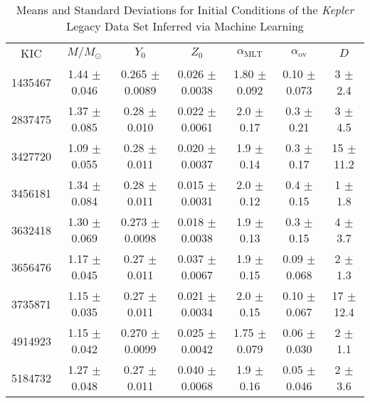 \documentclass[epjCONF,columns]{svjour} %
\begin{document}
\begin{table*}
    \centering
    \caption{Means and Standard Deviations for Initial Conditions of the \emph{Kepler} Legacy Data Set Inferred via Machine Learning}
    \label{tab:2}
    \fontsize{8}{9.5}\selectfont%
    \begin{tabular}{c|cccccc}
        \hline\noalign{\smallskip}
        KIC & $M/M_\odot$ & $Y_0$ & $Z_0$ & $\alpha_{\mathrm{MLT}}$ & $\alpha_{\mathrm{ov}}$ & $D$ \\
        \noalign{\smallskip}\hline\noalign{\smallskip}
1435467  &        1.44   $\pm$  0.046    &        0.265  $\pm$  0.0089   &        0.026  $\pm$  0.0038   &        1.80   $\pm$  0.092    &        0.10   $\pm$  0.073    &        3      $\pm$  2.4      \\
2837475  &        1.37   $\pm$  0.085    &        0.28   $\pm$  0.010    &        0.022  $\pm$  0.0061   &        2.0    $\pm$  0.17     &        0.3    $\pm$  0.21     &        3      $\pm$  4.5      \\
3427720  &        1.09   $\pm$  0.055    &        0.28   $\pm$  0.011    &        0.020  $\pm$  0.0037   &        1.9    $\pm$  0.14     &        0.3    $\pm$  0.17     &       15      $\pm$ 11.2      \\
3456181  &        1.34   $\pm$  0.084    &        0.28   $\pm$  0.011    &        0.015  $\pm$  0.0031   &        2.0    $\pm$  0.12     &        0.4    $\pm$  0.15     &        1      $\pm$  1.8      \\
3632418  &        1.30   $\pm$  0.069    &        0.273  $\pm$  0.0098   &        0.018  $\pm$  0.0038   &        1.9    $\pm$  0.13     &        0.3    $\pm$  0.15     &        4      $\pm$  3.7      \\
3656476  &        1.17   $\pm$  0.045    &        0.27   $\pm$  0.011    &        0.037  $\pm$  0.0067   &        1.9    $\pm$  0.15     &        0.09   $\pm$  0.068    &        2      $\pm$  1.3      \\
3735871  &        1.15   $\pm$  0.035    &        0.27   $\pm$  0.011    &        0.021  $\pm$  0.0034   &        2.0    $\pm$  0.15     &        0.10   $\pm$  0.067    &       17      $\pm$ 12.4      \\
4914923  &        1.15   $\pm$  0.042    &        0.270  $\pm$  0.0099   &        0.025  $\pm$  0.0042   &        1.75   $\pm$  0.079    &        0.06   $\pm$  0.030    &        2      $\pm$  1.1      \\
5184732  &        1.27   $\pm$  0.048    &        0.27   $\pm$  0.011    &        0.040  $\pm$  0.0068   &        1.9    $\pm$  0.16     &        0.05   $\pm$  0.046    &        2      $\pm$  3.6      \\

\end{tabular}
\end{table*}
\end{document}
